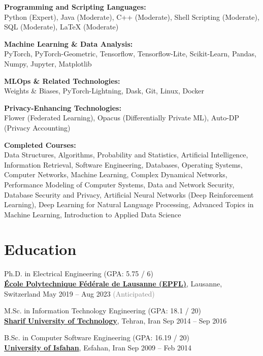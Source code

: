 \documentclass[11pt]{article}
\begin{document}
\begin{outerlist}
	\item \textbf{Programming and Scripting Languages:}\\
	{Python (Expert), Java (Moderate), C++ (Moderate), Shell Scripting (Moderate), SQL (Moderate), LaTeX (Moderate)}

	\item \textbf{Machine Learning \& Data Analysis:}\\
	{PyTorch, PyTorch-Geometric, Tensorflow, Tensorflow-Lite, Scikit-Learn, Pandas, Numpy, Jupyter, Matplotlib}

	\item \textbf{MLOps \& Related Technologies:}\\
	{Weights \& Biases, PyTorch-Lightning, Dask, Git, Linux, Docker}

	\item \textbf{Privacy-Enhancing Technologies:}\\
	{Flower (Federated Learning), Opacus (Differentially Private ML), Auto-DP (Privacy Accounting)}

  \item \textbf{Completed Courses:}\\
  Data Structures, Algorithms, Probability and Statistics, Artificial Intelligence, Information Retrieval, Software Engineering, Databases, Operating Systems, Computer Networks, Machine Learning, Complex Dynamical Networks, Performance Modeling of Computer Systems, Data and Network Security, Database Security and Privacy, Artificial Neural Networks (Deep Reinforcement Learning), Deep Learning for Natural Language Processing, Advanced Topics in Machine Learning, Introduction to Applied Data Science
\end{outerlist}


\section{Education}
\begin{outerlist}

	\item Ph.D. in Electrical Engineering (GPA: 5.75 / 6)\\
	\href{https://www.epfl.ch/en/home/}{\textbf{École Polytechnique Fédérale de Lausanne (EPFL)}}, Lausanne, Switzerland \hfill {May 2019 -- Aug 2023 \textcolor{gray}{(Anticipated)}}

	\item M.Sc. in Information Technology Engineering (GPA: 18.1 / 20)\\
	\href{http://www.en.sharif.edu/}{\textbf{Sharif University of Technology}}, Tehran, Iran \hfill {Sep 2014 -- Sep 2016}

	\item B.Sc. in Computer Software Engineering (GPA: 16.19 / 20)\\
	\href{http://ui.ac.ir/EN}{\textbf{University of Isfahan}}, Esfahan, Iran \hfill {Sep 2009 -- Feb 2014}

\end{outerlist}
\end{document}
